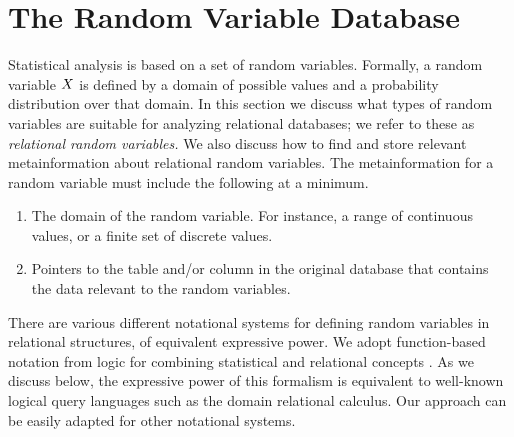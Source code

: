 \documentclass{acm_proc_article-sp}
\begin{document}
\section{The Random Variable Database} 

Statistical analysis is based on a set of random variables. Formally, a random variable $X$ is defined by a domain of possible values and a probability distribution over that domain. In this section we discuss what types of random variables are suitable for analyzing relational databases; we refer to these as {\em relational random variables.} We also discuss how to find and store relevant metainformation about relational random variables. The metainformation for a random variable must include the following at a minimum.

\begin{enumerate}
\item The domain of the random variable. For instance, a range of continuous values, or a finite set of discrete values.
\item Pointers to the table and/or column in the original database that contains the data relevant to the random variables. 
\end{enumerate}

There are various different notational systems for defining random variables in relational structures, of equivalent expressive power. We adopt function-based notation from logic for combining statistical and relational concepts \cite{Russell2010}. As we discuss below, the expressive power of this formalism is equivalent to well-known logical query languages such as the domain relational calculus. Our approach can be easily adapted for other notational systems.
\end{document}

